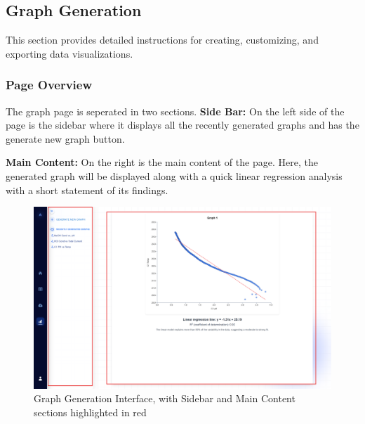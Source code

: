 \documentclass[12pt]{article}
\begin{document}
\subsection{Graph Generation}

This section provides detailed instructions for creating, customizing, and
exporting data visualizations.

\subsubsection{Page Overview}
The graph page is seperated in two sections. 
\newline \newline
\textbf{Side Bar:} On the left side of the page is the sidebar where it displays
all the recently generated graphs and has the generate new graph button.
\newline

\noindent \textbf{Main Content:} On the right is the main content of the page.
Here, the generated graph will be displayed along with a quick linear regression
analysis with a short statement of its findings.
\begin{figure}[H]
    \centering
    \includegraphics[width=1.2\textwidth]{./Diagrams/graph page .png}
    \caption{Graph Generation Interface, with Sidebar and Main Content sections highlighted in red}
    \label{fig:graphs}
\end{figure}
\end{document}
